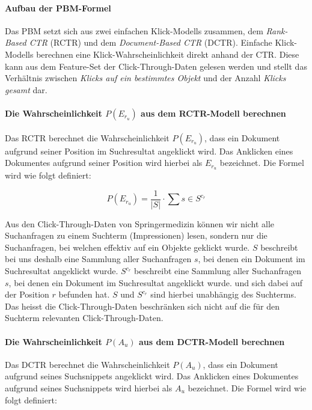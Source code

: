\paragraph{Aufbau der PBM-Formel}
Das PBM setzt sich aus zwei einfachen Klick-Modells zusammen, dem \textit{Rank-Based CTR} (RCTR) und dem \textit{Document-Based CTR} (DCTR). Einfache Klick-Modells berechnen eine Klick-Wahrscheinlichkeit direkt anhand der CTR. Diese kann aus dem Feature-Set der Click-Through-Daten gelesen werden und stellt das Verhältnis zwischen \textit{Klicks auf ein bestimmtes Objekt} und der Anzahl \textit{Klicks gesamt} dar. 

\paragraph{Die Wahrscheinlichkeit $P(E_{r_{u}})$ aus dem RCTR-Modell berechnen}
Das RCTR berechnet die Wahrscheinlichkeit $P(E_{r_{u}})$, dass ein Dokument aufgrund seiner Position im Suchresultat angeklickt wird. Das Anklicken eines Dokumentes aufgrund seiner Position wird hierbei als $E_{r_{u}}$ bezeichnet. Die Formel wird wie folgt definiert:

\vspace{-1.5em}
\begin{equation}	
	P(E_{r_{u}}) = \frac{1}{\vert S \vert} \cdot \sum{s \in S^{c_r}}
\end{equation}
\vspace{-1em}

Aus den Click-Through-Daten von Springermedizin können wir nicht alle Suchanfragen zu einem Suchterm (Impressionen) lesen, sondern nur die Suchanfragen, bei welchen effektiv auf ein Objekte geklickt wurde. $S$ beschreibt bei uns deshalb eine Sammlung aller Suchanfragen $s$, bei denen ein Dokument im Suchresultat angeklickt wurde. $S^{c_r}$ beschreibt eine Sammlung aller Suchanfragen $s$, bei denen ein Dokument im Suchresultat angeklickt wurde. und sich dabei auf der Position $r$ befunden hat. $S$ und $S^{c_r}$ sind hierbei unabhängig des Suchterms. Das heisst die Click-Through-Daten beschränken sich nicht auf die für den Suchterm relevanten Click-Through-Daten.  

\paragraph{Die Wahrscheinlichkeit $P(A_{u})$ aus dem DCTR-Modell berechnen}
Das DCTR berechnet die Wahrscheinlichkeit $P(A_{u})$, dass ein Dokument aufgrund seines Suchsnippets angeklickt wird. Das Anklicken eines Dokumentes aufgrund seines Suchsnippets wird hierbei als $A_{u}$ bezeichnet. Die Formel wird wie folgt definiert:

